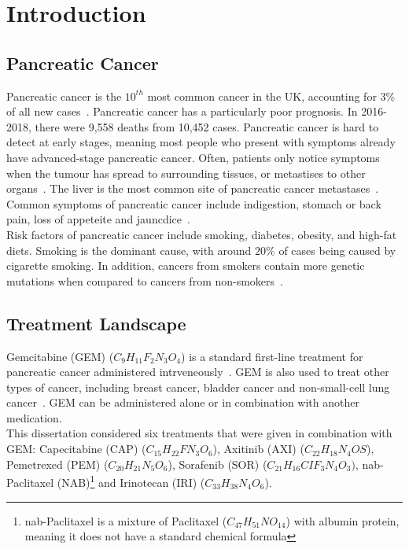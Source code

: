 \chapter{Introduction}

\section{Pancreatic Cancer}
Pancreatic cancer is the $10^{th}$ most common cancer in the UK, accounting for $3\%$ of all new cases~\cite{pancStat}. Pancreatic cancer has a particularly poor prognosis. In 2016-2018, there were 9,558 deaths from 10,452 cases. Pancreatic cancer is hard to detect at early stages, meaning most people who present with symptoms already have advanced-stage pancreatic cancer. Often, patients only notice symptoms when the tumour has spread to surrounding tissues, or metastises to other organs~\cite{kelsen}. The liver is the most common site of pancreatic cancer metastases~\cite{deeb}. Common symptoms of pancreatic cancer include indigestion, stomach or back pain, loss of appeteite and jauncdice~\cite{pancSymp}. \\

Risk factors of pancreatic cancer include smoking, diabetes, obesity, and high-fat diets. Smoking is the dominant cause, with around $20\%$ of cases being caused by cigarette smoking. In addition, cancers from smokers contain more genetic mutations when compared to cancers from non-smokers~\cite{blackford}. 

\section{Treatment Landscape}
Gemcitabine (GEM) ($C_9H_{11}F_2N_3O_4$) is a standard first-line treatment for pancreatic cancer administered intrveneously~\cite{NG85}. GEM is also used to treat other types of cancer, including breast cancer, bladder cancer and non-small-cell lung cancer~\cite{wong2009}. GEM can be administered alone or in combination with another medication.\\

This dissertation considered six treatments that were given in combination with GEM: Capecitabine (CAP) ($C_{15}H_{22}FN_3O_6$), Axitinib (AXI) ($C_{22}H_{18}N_4OS$), Pemetrexed (PEM) ($C_{20}H_{21}N_5O_6$), Sorafenib (SOR) ($C_{21}H_{16}CIF_{3}N_4O_3)$, nab-Paclitaxel (NAB)\footnote{nab-Paclitaxel is a mixture of Paclitaxel ($C_{47}H_{51}NO_{14}$) with albumin protein, meaning it does not have a standard chemical formula} and Irinotecan (IRI) ($C_{33}H_{38}N_4O_6$). \\

